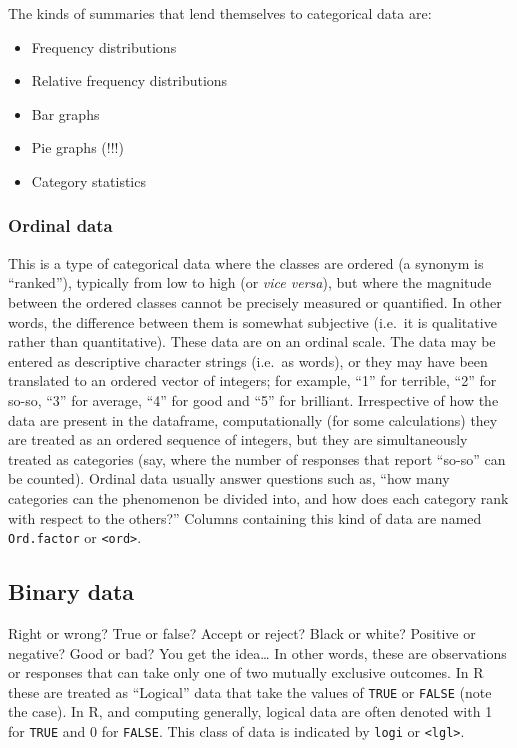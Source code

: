 \documentclass[english,10pt,a4paper,oneside]{book}
\providecommand{\tightlist}{%
  \setlength{\itemsep}{0pt}\setlength{\parskip}{0pt}}
\theoremstyle{definition}
\theoremstyle{definition}
\theoremstyle{definition}
\theoremstyle{remark}
\begin{document}
The kinds of summaries that lend themselves to categorical data are:

\begin{itemize}
\tightlist
\item
  Frequency distributions
\item
  Relative frequency distributions
\item
  Bar graphs
\item
  Pie graphs (!!!)
\item
  Category statistics
\end{itemize}

\subsubsection{Ordinal data}\label{ordinal-data}

This is a type of categorical data where the classes are ordered (a
synonym is \enquote{ranked}), typically from low to high (or \emph{vice
versa}), but where the magnitude between the ordered classes cannot be
precisely measured or quantified. In other words, the difference between
them is somewhat subjective (i.e.~it is qualitative rather than
quantitative). These data are on an ordinal scale. The data may be
entered as descriptive character strings (i.e.~as words), or they may
have been translated to an ordered vector of integers; for example,
\enquote{1} for terrible, \enquote{2} for so-so, \enquote{3} for
average, \enquote{4} for good and \enquote{5} for brilliant.
Irrespective of how the data are present in the dataframe,
computationally (for some calculations) they are treated as an ordered
sequence of integers, but they are simultaneously treated as categories
(say, where the number of responses that report \enquote{so-so} can be
counted). Ordinal data usually answer questions such as, \enquote{how
many categories can the phenomenon be divided into, and how does each
category rank with respect to the others?} Columns containing this kind
of data are named \texttt{Ord.factor} or
\texttt{\textless{}ord\textgreater{}}.

\subsection{Binary data}\label{binary-data}

Right or wrong? True or false? Accept or reject? Black or white?
Positive or negative? Good or bad? You get the idea\ldots{} In other
words, these are observations or responses that can take only one of two
mutually exclusive outcomes. In R these are treated as \enquote{Logical}
data that take the values of \texttt{TRUE} or \texttt{FALSE} (note the
case). In R, and computing generally, logical data are often denoted
with 1 for \texttt{TRUE} and 0 for \texttt{FALSE}. This class of data is
indicated by \texttt{logi} or \texttt{\textless{}lgl\textgreater{}}.
\end{document}
